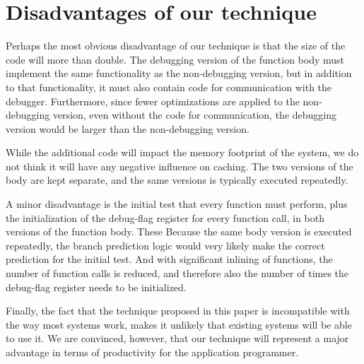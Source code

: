 \section{Disadvantages of our technique}

Perhaps the most obvious disadvantage of our technique is that the
size of the code will more than double.  The debugging version of the
function body must implement the same functionality as the
non-debugging version, but in addition to that functionality, it must
also contain code for communication with the debugger.  Furthermore,
since fewer optimizations are applied to the non-debugging version,
even without the code for communication, the debugging version would
be larger than the non-debugging version.

While the additional code will impact the memory footprint of the
system, we do not think it will have any negative influence on
caching.  The two versions of the body are kept separate, and the same
versions is typically executed repeatedly.

A minor disadvantage is the initial test that every function must
perform, plus the initialization of the debug-flag register for every
function call, in both versions of the function body.  These
Because the same body version is executed repeatedly, the branch
prediction logic would very likely make the correct prediction for the
initial test.  And with significant inlining of functions, the number
of function calls is reduced, and therefore also the number of times
the debug-flag register needs to be initialized.

Finally, the fact that the technique proposed in this paper is
incompatible with the way most \commonlisp{} systems work, makes it
unlikely that existing systems will be able to use it.  We are
convinced, however, that our technique will represent a major
advantage in terms of productivity for the application programmer.
